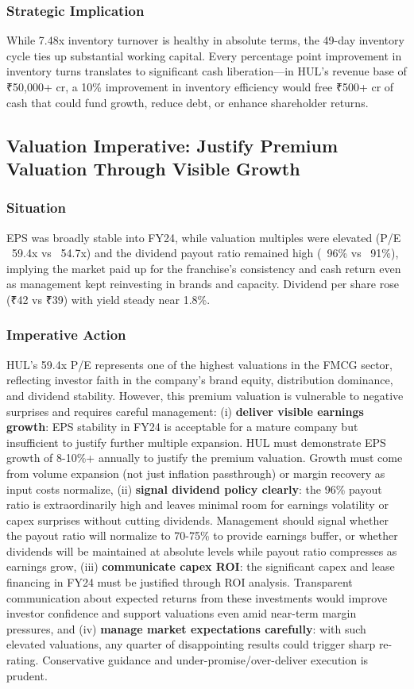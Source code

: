 \documentclass[12pt, a4paper]{report}
\begin{document}
\subsubsection{Strategic Implication}
While 7.48x inventory turnover is healthy in absolute terms, the 49-day inventory cycle ties up substantial working capital. Every percentage point improvement in inventory turns translates to significant cash liberation—in HUL's revenue base of ₹50,000+ cr, a 10\% improvement in inventory efficiency would free ₹500+ cr of cash that could fund growth, reduce debt, or enhance shareholder returns.

\subsection{Valuation Imperative: Justify Premium Valuation Through Visible Growth}

\subsubsection{Situation}
EPS was broadly stable into FY24, while valuation multiples were elevated (P/E ~59.4x vs ~54.7x) and the dividend payout ratio remained high (~96\% vs ~91\%), implying the market paid up for the franchise's consistency and cash return even as management kept reinvesting in brands and capacity. Dividend per share rose (₹42 vs ₹39) with yield steady near 1.8\%.

\subsubsection{Imperative Action}
HUL's 59.4x P/E represents one of the highest valuations in the FMCG sector, reflecting investor faith in the company's brand equity, distribution dominance, and dividend stability. However, this premium valuation is vulnerable to negative surprises and requires careful management: (i) \textbf{deliver visible earnings growth}: EPS stability in FY24 is acceptable for a mature company but insufficient to justify further multiple expansion. HUL must demonstrate EPS growth of 8-10\%+ annually to justify the premium valuation. Growth must come from volume expansion (not just inflation passthrough) or margin recovery as input costs normalize, (ii) \textbf{signal dividend policy clearly}: the 96\% payout ratio is extraordinarily high and leaves minimal room for earnings volatility or capex surprises without cutting dividends. Management should signal whether the payout ratio will normalize to 70-75\% to provide earnings buffer, or whether dividends will be maintained at absolute levels while payout ratio compresses as earnings grow, (iii) \textbf{communicate capex ROI}: the significant capex and lease financing in FY24 must be justified through ROI analysis. Transparent communication about expected returns from these investments would improve investor confidence and support valuations even amid near-term margin pressures, and (iv) \textbf{manage market expectations carefully}: with such elevated valuations, any quarter of disappointing results could trigger sharp re-rating. Conservative guidance and under-promise/over-deliver execution is prudent.
\end{document}
